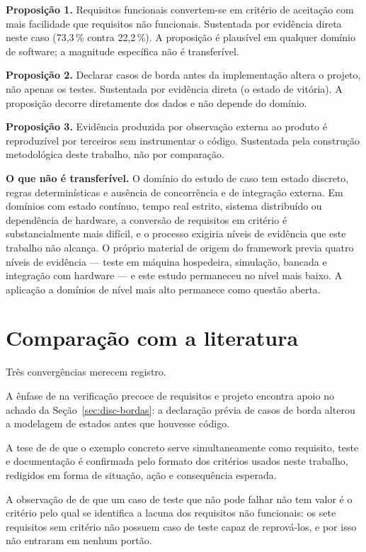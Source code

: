 \textbf{Proposição 1.} Requisitos funcionais convertem-se em critério de
aceitação com mais facilidade que requisitos não funcionais. Sustentada por
evidência direta neste caso (73,3\,\% contra 22,2\,\%). A proposição é plausível
em qualquer domínio de software; a magnitude específica não é transferível.

\textbf{Proposição 2.} Declarar casos de borda antes da implementação altera o
projeto, não apenas os testes. Sustentada por evidência direta (o estado de
vitória). A proposição decorre diretamente dos dados e não depende do domínio.

\textbf{Proposição 3.} Evidência produzida por observação externa ao produto é
reproduzível por terceiros sem instrumentar o código. Sustentada pela construção
metodológica deste trabalho, não por comparação.

\textbf{O que não é transferível.} O domínio do estudo de caso tem estado
discreto, regras determinísticas e ausência de concorrência e de integração
externa. Em domínios com estado contínuo, tempo real estrito, sistema distribuído
ou dependência de hardware, a conversão de requisitos em critério é
substancialmente mais difícil, e o processo exigiria níveis de evidência que este
trabalho não alcança. O próprio material de origem do framework previa quatro
níveis de evidência --- teste em máquina hospedeira, simulação, bancada e
integração com hardware --- e este estudo permaneceu no nível mais baixo. A
aplicação a domínios de nível mais alto permanece como questão aberta.

\section{Comparação com a literatura}
\label{sec:disc-literatura}

Três convergências merecem registro.

A ênfase de  na verificação precoce de requisitos e projeto
encontra apoio no achado da Seção~\ref{sec:disc-bordas}: a declaração prévia de
casos de borda alterou a modelagem de estados antes que houvesse código.

A tese de  de que o exemplo concreto serve
simultaneamente como requisito, teste e documentação é confirmada pelo formato
dos critérios usados neste trabalho, redigidos em forma de situação, ação e
consequência esperada.

A observação de  de que um caso de teste que não pode
falhar não tem valor é o critério pelo qual se identifica a lacuna dos requisitos
não funcionais: os sete requisitos sem critério não possuem caso de teste capaz de
reprová-los, e por isso não entraram em nenhum portão.

